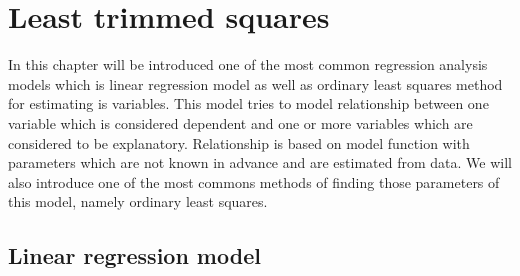 \listoftodos

\chapter{Least trimmed squares}
In this chapter will be introduced one of the most common regression analysis models which is linear regression model as well as ordinary least squares method for estimating is variables. This model tries to model relationship between one variable which is considered dependent and one or more variables which are considered to be explanatory. Relationship is based on model function with parameters which are not known in advance and are estimated from data. We will also introduce one of the most commons methods of finding those parameters of this model, namely ordinary least squares.
\section{Linear regression model}
